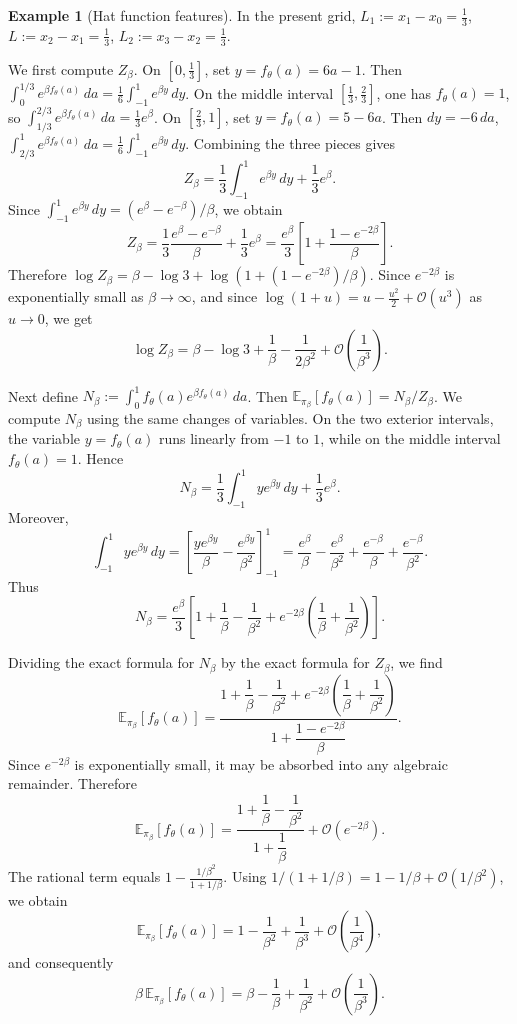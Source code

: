 \documentclass{amsart}
\theoremstyle{definition}
\newtheorem{example}{Example}
\begin{document}
\begin{example}[Hat function features]
In the present grid, $L_1:=x_1-x_0=\frac13$, $L:=x_2-x_1=\frac13$, $L_2:=x_3-x_2=\frac13$.

We first compute $Z_\beta$. On $[0,\frac13]$, set $y=f_\theta(a)=6a-1$. Then $\int_0^{1/3} e^{\beta f_\theta(a)}\,da=\frac16\int_{-1}^1 e^{\beta y}\,dy$. On the middle interval $[\frac13,\frac23]$, one has $f_\theta(a)=1$, so $\int_{1/3}^{2/3} e^{\beta f_\theta(a)}\,da=\frac13 e^\beta$. On $[\frac23,1]$, set $y=f_\theta(a)=5-6a$. Then $dy=-6\,da$, $\int_{2/3}^{1} e^{\beta f_\theta(a)}\,da=\frac16\int_{-1}^1 e^{\beta y}\,dy$. Combining the three pieces gives
\[
Z_\beta
=
\frac13\int_{-1}^1 e^{\beta y}\,dy+\frac13 e^\beta .
\]
Since $\int_{-1}^1 e^{\beta y}\,dy=(e^\beta-e^{-\beta})/\beta$, we obtain
\[
Z_\beta
=
\frac13\frac{e^\beta-e^{-\beta}}{\beta}+\frac13 e^\beta
=
\frac{e^\beta}{3}\left[1+\frac{1-e^{-2\beta}}{\beta}\right].
\]
Therefore $\log Z_\beta=\beta-\log 3+\log(1+(1-e^{-2\beta})/\beta)$. Since $e^{-2\beta}$ is exponentially small as $\beta\to\infty$, and since $\log(1+u)=u-\frac{u^2}{2}+\mathcal O(u^3)$ as $u\to 0$, we get
\[
\log Z_\beta
=
\beta-\log 3+\frac1\beta-\frac{1}{2\beta^2}
+
\mathcal O\!\left(\frac1{\beta^3}\right).
\]

Next define $N_\beta:=\int_0^1 f_\theta(a)e^{\beta f_\theta(a)}\,da$. Then $\mathbb E_{\pi_\beta}[f_\theta(a)]=N_\beta/Z_\beta$. We compute $N_\beta$ using the same changes of variables. On the two exterior intervals, the variable $y=f_\theta(a)$ runs linearly from $-1$ to $1$, while on the middle interval $f_\theta(a)=1$. Hence
\[
N_\beta
=
\frac13\int_{-1}^1 y e^{\beta y}\,dy+\frac13 e^\beta .
\]
Moreover,
\[
\int_{-1}^1 y e^{\beta y}\,dy
=
\left[
\frac{y e^{\beta y}}{\beta}
-
\frac{e^{\beta y}}{\beta^2}
\right]_{-1}^{1}
=
\frac{e^\beta}{\beta}
-
\frac{e^\beta}{\beta^2}
+
\frac{e^{-\beta}}{\beta}
+
\frac{e^{-\beta}}{\beta^2}.
\]
Thus
\[
N_\beta
=
\frac{e^\beta}{3}
\left[
1+\frac1\beta-\frac1{\beta^2}
+
e^{-2\beta}
\left(
\frac1\beta+\frac1{\beta^2}
\right)
\right].
\]

Dividing the exact formula for $N_\beta$ by the exact formula for $Z_\beta$, we find
\[
\mathbb E_{\pi_\beta}[f_\theta(a)]
=
\frac{
1+\dfrac1\beta-\dfrac1{\beta^2}
+
e^{-2\beta}\left(\dfrac1\beta+\dfrac1{\beta^2}\right)
}{
1+\dfrac{1-e^{-2\beta}}{\beta}
}.
\]
Since $e^{-2\beta}$ is exponentially small, it may be absorbed into any algebraic remainder. Therefore
\[
\mathbb E_{\pi_\beta}[f_\theta(a)]
=
\frac{1+\dfrac1\beta-\dfrac1{\beta^2}}{1+\dfrac1\beta}
+
\mathcal O(e^{-2\beta}).
\]
The rational term equals $1-\frac{1/\beta^2}{1+1/\beta}$. Using $1/(1+1/\beta)=1-1/\beta+\mathcal O(1/\beta^2)$, we obtain
\[
\mathbb E_{\pi_\beta}[f_\theta(a)]
=
1-\frac1{\beta^2}+\frac1{\beta^3}
+
\mathcal O\!\left(\frac1{\beta^4}\right),
\]
and consequently
\[
\beta\,\mathbb E_{\pi_\beta}[f_\theta(a)]
=
\beta-\frac1\beta+\frac1{\beta^2}
+
\mathcal O\!\left(\frac1{\beta^3}\right).
\]


\end{example}
\end{document}
